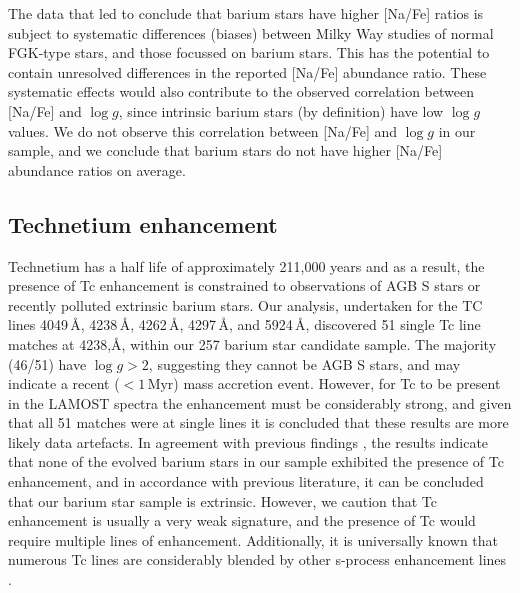\documentclass[a4paper,fleqn,usenatbib]{mnras}
\begin{document}
The data that led \citet{decastro2016} to conclude that barium stars have higher [Na/Fe] ratios is subject to systematic differences (biases) between Milky Way studies of normal FGK-type stars, and those focussed on barium stars. This has the potential to contain unresolved differences in the reported [Na/Fe] abundance ratio. These systematic effects would also contribute to the observed correlation between [Na/Fe] and $\log{g}$, since intrinsic barium stars (by definition) have low $\log{g}$ values. We do not observe this correlation between [Na/Fe] and $\log{g}$ in our sample, and we conclude that barium stars do not have higher [Na/Fe] abundance ratios on average.

\subsection{Technetium enhancement}

Technetium has a half life of approximately 211,000 years and as a result, the presence of Tc enhancement is constrained to observations of AGB S stars \citep{jorissen1993} or recently polluted extrinsic barium stars. Our analysis, undertaken for the TC lines 4049\,\AA, 4238\,\AA, 4262\,\AA, 4297\,\AA, and 5924\,\AA, discovered 51 single Tc line matches at 4238,\AA, within our 257 barium star candidate sample. The majority (46/51) have $\log{g} > 2$, suggesting they cannot be AGB S stars, and may indicate a recent ($<1\,\textrm{Myr}$) mass accretion event. However, for Tc to be present in the LAMOST spectra the enhancement must be considerably strong, and given that all 51 matches were at single lines it is concluded that these results are more likely data artefacts. In agreement with previous findings \citep[e.g.,][]{little1987,smith1984,smith1983}, the results indicate that none of the evolved barium stars in our sample exhibited the presence of Tc enhancement, and in accordance with previous literature, it can be concluded that our barium star sample is extrinsic. However, we caution that Tc enhancement is usually a very weak signature, and the presence of Tc would require multiple lines of enhancement. Additionally, it is universally known that numerous Tc lines are considerably blended by other s-process enhancement lines \citep[e.g.,][]{van1999}. 
\end{document}
